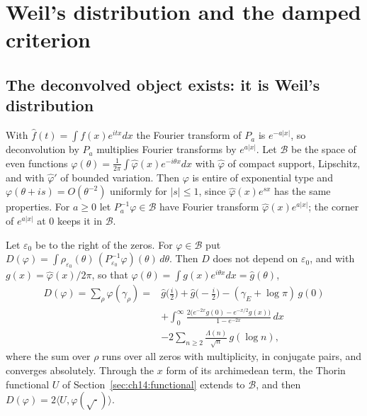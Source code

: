 \section{Weil's distribution and the damped criterion}

\subsection{The deconvolved object exists: it is Weil's distribution}\label{dc:sec:weil}

With $\hat f(t)=\int f(x)e^{itx}dx$ the Fourier transform of $P_a$ is $e^{-a|x|}$, so deconvolution by $P_a$ multiplies Fourier transforms by $e^{a|x|}$. Let $\mathcal B$ be the space of even functions $\varphi(\theta)=\frac1{2\pi}\int\hat\varphi(x)e^{-i\theta x}dx$ with $\hat\varphi$ of compact support, Lipschitz, and with $\hat\varphi'$ of bounded variation. Then $\varphi$ is entire of exponential type and $\varphi(\theta+is)=O(\theta^{-2})$ uniformly for $|s|\le1$, since $\hat\varphi(x)e^{sx}$ has the same properties. For $a\ge0$ let $P_a^{-1}\varphi\in\mathcal B$ have Fourier transform $\hat\varphi(x)e^{a|x|}$; the corner of $e^{a|x|}$ at $0$ keeps it in $\mathcal B$.

\begin{theorem}\label{dc:thm:weil}
Let $\varepsilon_0$ be to the right of the zeros. For $\varphi\in\mathcal B$ put $D(\varphi)=\int\rho_{\varepsilon_0}(\theta)\,(P_{\varepsilon_0}^{-1}\varphi)(\theta)\,d\theta$. Then $D$ does not depend on $\varepsilon_0$, and with $g(x)=\hat\varphi(x)/2\pi$, so that $\varphi(\theta)=\int g(x)e^{i\theta x}dx=\hat g(\theta)$,
\[
\begin{aligned}
D(\varphi)=\sum_\rho\varphi(\gamma_\rho)={}&\hat g\big(\tfrac i2\big)+\hat g\big(-\tfrac i2\big)-(\gamma_E+\log\pi)\,g(0)\\
&+\int_0^\infty\frac{2\big(e^{-2x}g(0)-e^{-x/2}g(x)\big)}{1-e^{-2x}}\,dx\\
&-2\sum_{n\ge2}\frac{\Lambda(n)}{\sqrt n}\,g(\log n),
\end{aligned}
\]
where the sum over $\rho$ runs over all zeros with multiplicity, in conjugate pairs, and converges absolutely. Through the $x$ form of its archimedean term, the Thorin functional $U$ of Section~\ref{sec:ch14:functional} extends to $\mathcal B$, and then $D(\varphi)=2\langle U,\varphi(\sqrt{\cdot})\rangle$.
\end{theorem}

